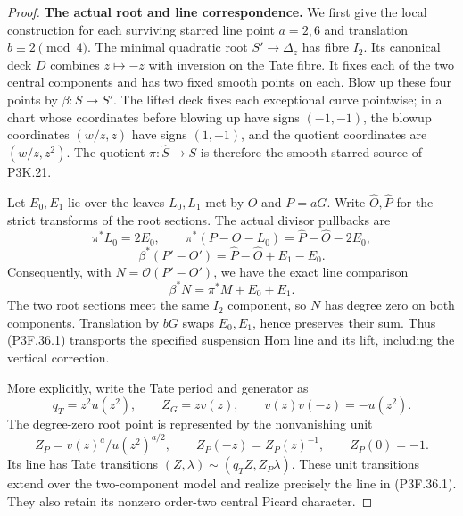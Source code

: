 \begin{proof}
\par\medskip\noindent\textbf{The actual root and line correspondence.}
We first give the local construction for each surviving starred
line point \(a=2,6\) and translation \(b\equiv2\pmod4\).
The minimal quadratic root \(S'\to\Delta_z\) has fibre
\(I_2\). Its canonical deck \(D\) combines \(z\mapsto-z\)
with inversion on the Tate fibre. It fixes each of the two central
components and has two fixed smooth points on each. Blow up these
four points by \(\beta:\widehat S\to S'\). The lifted deck
fixes each exceptional curve pointwise; in a chart whose coordinates
before blowing up have signs \((-1,-1)\), the blowup coordinates
\((w/z,z)\) have signs \((1,-1)\), and the quotient coordinates
are \((w/z,z^2)\). The quotient \(\pi:\widehat S\to S\)
is therefore the smooth starred source of P3K.21.

Let \(E_0,E_1\) lie over the leaves \(L_0,L_1\) met by
\(O\) and \(P=aG\). Write \(\widehat O,\widehat P\)
for the strict transforms of the root sections. The actual divisor
pullbacks are
\[
 \pi^*L_0=2E_0,\qquad
 \pi^*(P-O-L_0)=\widehat P-\widehat O-2E_0,
\]
\[
 \beta^*(P'-O')=\widehat P-\widehat O+E_1-E_0.
\]
Consequently, with \(N=\mathcal O(P'-O')\), we have the exact
line comparison
\[
                  \beta^*N=\pi^*M+E_0+E_1.                 \tag{P3F.36.1}
\]
The two root sections meet the same \(I_2\) component, so \(N\)
has degree zero on both components. Translation by \(bG\) swaps
\(E_0,E_1\), hence preserves their sum. Thus (P3F.36.1) transports
the specified suspension Hom line and its lift, including the
vertical correction.

More explicitly, write the Tate period and generator as
\[
 q_T=z^2u(z^2),\qquad Z_G=zv(z),\qquad
                  v(z)v(-z)=-u(z^2).
\]
The degree-zero root point is represented by the nonvanishing unit
\[
 Z_P=v(z)^a/u(z^2)^{a/2},\qquad
 Z_P(-z)=Z_P(z)^{-1},\qquad Z_P(0)=-1.
\]
Its line has Tate transitions
\((Z,\lambda)\sim(q_TZ,Z_P\lambda)\). These unit transitions
extend over the two-component model and realize precisely the
line in (P3F.36.1). They also retain its nonzero order-two central
Picard character.


\end{proof}
